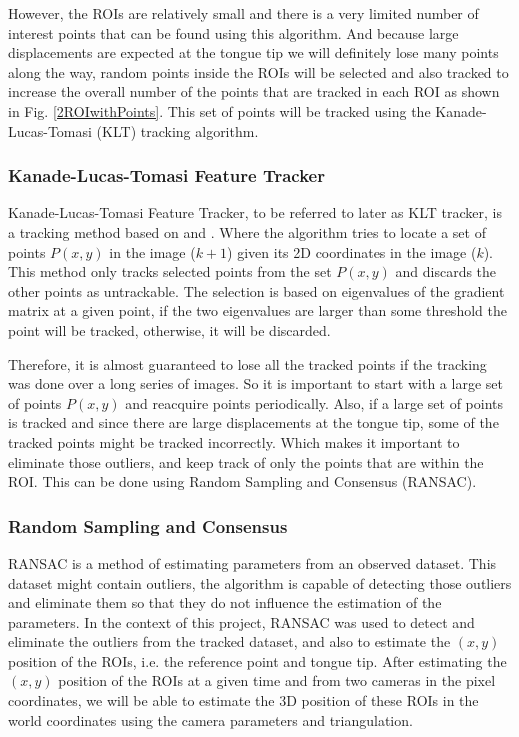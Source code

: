 \documentclass[journal]{IEEEtran}
\begin{document}
 However, the ROIs are relatively small and there is a very limited number of interest points that can be found using this algorithm. And because large displacements are expected at the tongue tip we will definitely lose many points along the way, random points inside the ROIs will be selected and also tracked to increase the overall number of the points that are tracked in each ROI as shown in Fig. \ref{2ROIwithPoints}. This set of points will be tracked using the Kanade-Lucas-Tomasi (KLT) tracking algorithm.

\subsubsection{Kanade-Lucas-Tomasi Feature Tracker}
Kanade-Lucas-Tomasi Feature Tracker, to be referred to later as KLT tracker, is a tracking method based on \cite{KL} and \cite{KLT}. Where the algorithm tries to locate a set of points $P(x,y)$ in the image ($k+1$) given its 2D coordinates in the image ($k$). This method only tracks selected points from the set $P(x,y)$ and discards the other points as untrackable. The selection is based on eigenvalues of the gradient matrix at a given point, if the two eigenvalues are larger than some threshold the point will be tracked, otherwise, it will be discarded.

Therefore, it is almost guaranteed to lose all the tracked points if the tracking was done over a long series of images. So it is important to start with a large set of points $P(x,y)$ and reacquire points periodically. Also, if a large set of points is tracked and since there are large displacements at the tongue tip, some of the tracked points might be tracked incorrectly. Which makes it important to eliminate those outliers, and keep track of only the points that are within the ROI. This can be done using Random Sampling and Consensus (RANSAC).
\subsubsection{Random Sampling and Consensus}
RANSAC is a method of estimating parameters from an observed dataset. This dataset might contain outliers, the algorithm is capable of detecting those outliers and eliminate them so that they do not influence the estimation of the parameters. In the context of this project, RANSAC was used to detect and eliminate the outliers from the tracked dataset, and also to estimate the $(x,y)$ position of the ROIs, i.e. the reference point and tongue tip. After estimating the $(x,y)$ position of the ROIs at a given time and from two cameras in the pixel coordinates, we will be able to estimate the 3D position of these ROIs in the world coordinates using the camera parameters and triangulation.
\end{document}
